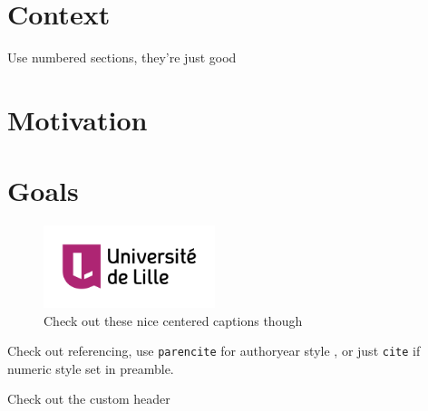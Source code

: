 \section{Context}

Use numbered sections, they're just good

\section{Motivation}



\section{Goals}

\begin{figure} %
    \centering
    \includegraphics[width=5cm]{Images/universite_de_lille.png}
    \caption{Check out these nice centered captions though}
    \label{fig:my_label}
\end{figure}

Check out referencing, use \texttt{parencite} for authoryear style \parencite{reflabel}, or just \texttt{cite} if numeric style set in preamble. \lipsum[4] 

\lipsum[5] 

\lipsum[6] 

\lipsum[7]

\begin{invsummary}
Check out the custom header
\end{invsummary}